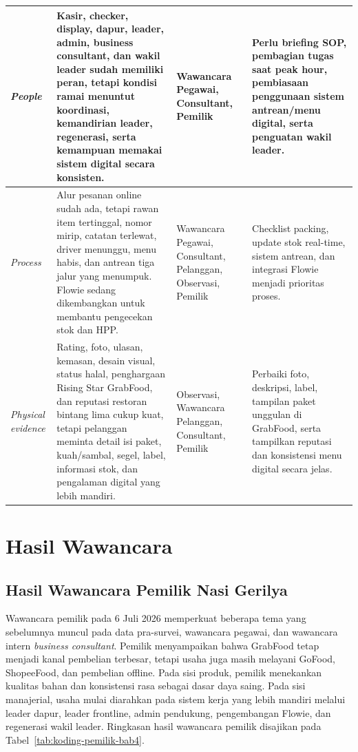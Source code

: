 \begin{xltabular}{\textwidth}{|Z{1.45cm}|Y|L{2.85cm}|Y|}
        \textit{People} & Kasir, checker, display, dapur, leader, admin, business consultant, dan wakil leader sudah memiliki peran, tetapi kondisi ramai menuntut koordinasi, kemandirian leader, regenerasi, serta kemampuan memakai sistem digital secara konsisten. & Wawancara Pegawai, Consultant, Pemilik & Perlu briefing SOP, pembagian tugas saat peak hour, pembiasaan penggunaan sistem antrean/menu digital, serta penguatan wakil leader. \\ \hline
        \textit{Process} & Alur pesanan online sudah ada, tetapi rawan item tertinggal, nomor mirip, catatan terlewat, driver menunggu, menu habis, dan antrean tiga jalur yang menumpuk. Flowie sedang dikembangkan untuk membantu pengecekan stok dan HPP. & Wawancara Pegawai, Consultant, Pelanggan, Observasi, Pemilik & Checklist packing, update stok real-time, sistem antrean, dan integrasi Flowie menjadi prioritas proses. \\ \hline
        \textit{Physical evidence} & Rating, foto, ulasan, kemasan, desain visual, status halal, penghargaan Rising Star GrabFood, dan reputasi restoran bintang lima cukup kuat, tetapi pelanggan meminta detail isi paket, kuah/sambal, segel, label, informasi stok, dan pengalaman digital yang lebih mandiri. & Observasi, Wawancara Pelanggan, Consultant, Pemilik & Perbaiki foto, deskripsi, label, tampilan paket unggulan di GrabFood, serta tampilkan reputasi dan konsistensi menu digital secara jelas. \\ \hline
    \end{xltabular}
\endgroup

\section{Hasil Wawancara}


\subsection{Hasil Wawancara Pemilik Nasi Gerilya}
Wawancara pemilik pada 6 Juli 2026 memperkuat beberapa tema yang sebelumnya muncul pada data pra-survei, wawancara pegawai, dan wawancara intern \textit{business consultant}. Pemilik menyampaikan bahwa GrabFood tetap menjadi kanal pembelian terbesar, tetapi usaha juga masih melayani GoFood, ShopeeFood, dan pembelian offline. Pada sisi produk, pemilik menekankan kualitas bahan dan konsistensi rasa sebagai dasar daya saing. Pada sisi manajerial, usaha mulai diarahkan pada sistem kerja yang lebih mandiri melalui leader dapur, leader frontline, admin pendukung, pengembangan Flowie, dan regenerasi wakil leader. Ringkasan hasil wawancara pemilik disajikan pada Tabel~\ref{tab:koding-pemilik-bab4}.

